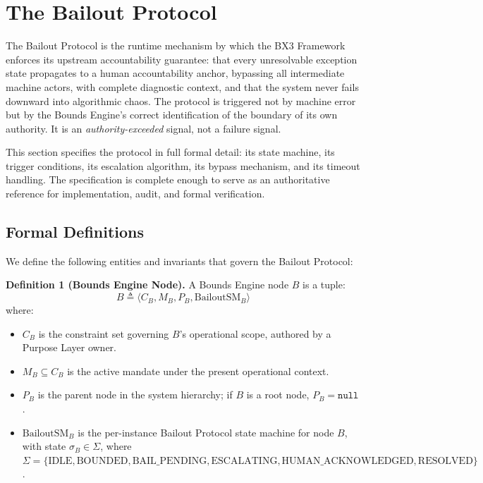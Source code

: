 \section{The Bailout Protocol}
\label{sec:bailout-protocol}

The Bailout Protocol is the runtime mechanism by which the BX3 Framework enforces its upstream accountability guarantee: that every unresolvable exception state propagates to a human accountability anchor, bypassing all intermediate machine actors, with complete diagnostic context, and that the system never fails downward into algorithmic chaos. The protocol is triggered not by machine error but by the Bounds Engine's correct identification of the boundary of its own authority. It is an \textit{authority-exceeded} signal, not a failure signal.

This section specifies the protocol in full formal detail: its state machine, its trigger conditions, its escalation algorithm, its bypass mechanism, and its timeout handling. The specification is complete enough to serve as an authoritative reference for implementation, audit, and formal verification.

\subsection{Formal Definitions}
\label{sec:bailout-formal-definitions}

We define the following entities and invariants that govern the Bailout Protocol:

\medskip

\noindent\textbf{Definition 1 (Bounds Engine Node).} A Bounds Engine node $B$ is a tuple:
\begin{equation}
B \triangleq \langle C_B, M_B, P_B, \text{BailoutSM}_B \rangle
\end{equation}
where:
\begin{itemize}\setlength\itemsep{0.25em}
\item $C_B$ is the constraint set governing $B$'s operational scope, authored by a Purpose Layer owner.
\item $M_B \subseteq C_B$ is the active mandate under the present operational context.
\item $P_B$ is the parent node in the system hierarchy; if $B$ is a root node, $P_B = \texttt{null}$.
\item $\text{BailoutSM}_B$ is the per-instance Bailout Protocol state machine for node $B$, with state $\sigma_B \in \Sigma$, where $\Sigma = \{\text{IDLE}, \text{BOUNDED}, \text{BAIL\_PENDING}, \text{ESCALATING}, \text{HUMAN\_ACKNOWLEDGED}, \text{RESOLVED}\}$.
\end{itemize}

